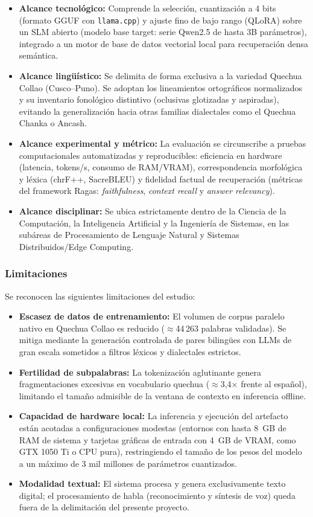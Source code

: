 \begin{itemize}
	\item \textbf{Alcance tecnológico:} Comprende la selección, cuantización a 4 bits (formato GGUF con \texttt{llama.cpp}) y ajuste fino de bajo rango (QLoRA) sobre un SLM abierto (modelo base target: serie Qwen2.5 de hasta 3B parámetros), integrado a un motor de base de datos vectorial local para recuperación densa semántica.
	\item \textbf{Alcance lingüístico:} Se delimita de forma exclusiva a la variedad Quechua Collao (Cusco--Puno). Se adoptan los lineamientos ortográficos normalizados y su inventario fonológico distintivo (oclusivas glotizadas y aspiradas), evitando la generalización hacia otras familias dialectales como el Quechua Chanka o Ancash.
	\item \textbf{Alcance experimental y métrico:} La evaluación se circunscribe a pruebas computacionales automatizadas y reproducibles: eficiencia en hardware (latencia, tokens/s, consumo de RAM/VRAM), correspondencia morfológica y léxica (chrF++, SacreBLEU) y fidelidad factual de recuperación (métricas del framework Ragas: \textit{faithfulness}, \textit{context recall} y \textit{answer relevancy}).
	\item \textbf{Alcance disciplinar:} Se ubica estrictamente dentro de la Ciencia de la Computación, la Inteligencia Artificial y la Ingeniería de Sistemas, en las subáreas de Procesamiento de Lenguaje Natural y Sistemas Distribuidos/Edge Computing.
\end{itemize}

\subsubsection{Limitaciones}
Se reconocen las siguientes limitaciones del estudio:
\begin{itemize}
	\item \textbf{Escasez de datos de entrenamiento:} El volumen de corpus paralelo nativo en Quechua Collao es reducido ($\approx$44\,263 palabras validadas). Se mitiga mediante la generación controlada de pares bilingües con LLMs de gran escala sometidos a filtros léxicos y dialectales estrictos.
	\item \textbf{Fertilidad de subpalabras:} La tokenización aglutinante genera fragmentaciones excesivas en vocabulario quechua ($\approx$3,4$\times$ frente al español), limitando el tamaño admisible de la ventana de contexto en inferencia offline.
	\item \textbf{Capacidad de hardware local:} La inferencia y ejecución del artefacto están acotadas a configuraciones modestas (entornos con hasta 8~GB de RAM de sistema y tarjetas gráficas de entrada con 4~GB de VRAM, como GTX 1050 Ti o CPU pura), restringiendo el tamaño de los pesos del modelo a un máximo de 3 mil millones de parámetros cuantizados.
	\item \textbf{Modalidad textual:} El sistema procesa y genera exclusivamente texto digital; el procesamiento de habla (reconocimiento y síntesis de voz) queda fuera de la delimitación del presente proyecto.
\end{itemize}

